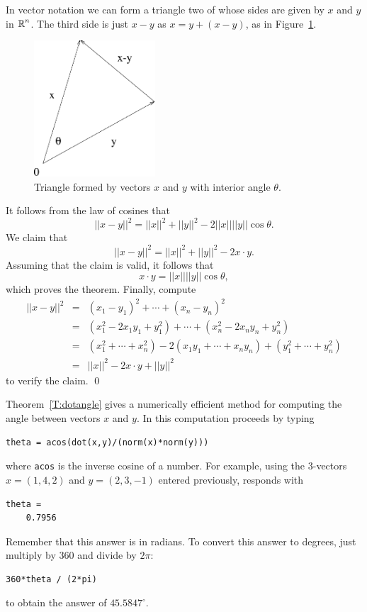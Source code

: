 \documentclass{ximera}
\begin{document}
 \quad 
In vector notation we can form a triangle two of whose sides are
given by $x$ and $y$ in $\mbox{$\mathbb{R}$}^n$.  The third side is just $x-y$ as
$x=y+(x-y)$, as in Figure~\ref{F:costri}.

\begin{figure}[htb]
     \centerline{%
     \includegraphics[height=2.0in]{../figures/costri.pdf}}
     \caption{Triangle formed by vectors $x$ and $y$ with interior
	angle $\theta$.}
     \label{F:costri}
\end{figure}

It follows from the law of cosines that
\[
||x-y||^2 = ||x||^2 + ||y||^2 - 2||x|| ||y||  \cos\theta.
\]
We claim that
\[
||x-y||^2 = ||x||^2 + ||y||^2 -2x\cdot y.
\]
Assuming that the claim is valid, it follows that
\[
x\cdot y = ||x|| ||y||  \cos\theta,
\]
which proves the theorem.  Finally, compute
\begin{eqnarray*}
||x-y||^2 & = &(x_1-y_1)^2 + \cdots + (x_n-y_n)^2 \\
& = & (x_1^2-2x_1y_1+y_1^2) + \cdots + (x_n^2-2x_ny_n+y_n^2)\\
& = & (x_1^2+\cdots+x_n^2)-2(x_1y_1+\cdots+x_ny_n)+(y_1^2+\cdots+y_n^2)\\
& = & ||x||^2 -2x\cdot y + ||y||^2
\end{eqnarray*}
to verify the claim.   \qed

Theorem~\ref{T:dotangle} gives a numerically efficient method
for computing the angle between
vectors $x$ and $y$.  In \Matlab
this computation proceeds by typing
\begin{verbatim}
theta = acos(dot(x,y)/(norm(x)*norm(y)))
\end{verbatim} 
where {\tt acos} is the inverse cosine of a number.
For example, using the $3$-vectors $x = (1,4,2)$ and $y =
(2,3,-1)$ entered previously, \Matlab responds with
\begin{verbatim}
theta =
    0.7956
\end{verbatim}
Remember that this answer is in radians.  To convert
this answer to degrees, just multiply by $360$ and
divide by $2\pi$:
\begin{verbatim}
360*theta / (2*pi)
\end{verbatim}
to obtain the answer of $45.5847^\circ$.
\end{document}
